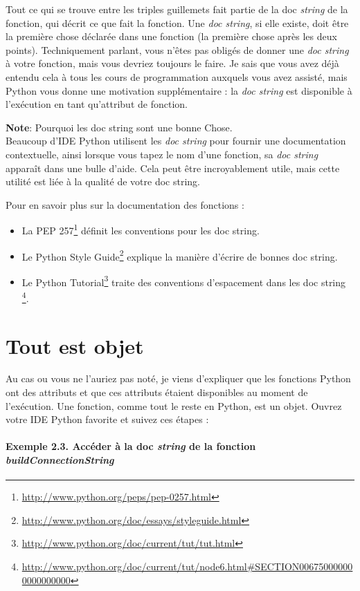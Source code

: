 Tout ce qui se trouve entre les triples guillemets fait partie de la doc \emph{string} de la fonction, qui décrit ce que fait la fonction. Une \emph{doc string}, si elle existe, doit être la première chose déclarée dans une fonction (la première chose après les deux points). Techniquement parlant, vous n'êtes pas obligés de donner une \emph{doc string} à votre fonction, mais vous devriez toujours le faire. Je sais que vous avez déjà entendu cela à tous les cours de programmation auxquels vous avez assisté, mais Python vous donne une motivation supplémentaire : la \emph{doc string} est disponible à l'exécution en tant qu'attribut de fonction.

\medskip
\noindent \textbf{Note}: Pourquoi les doc string sont une bonne Chose.\\
Beaucoup d'IDE Python utilisent les \emph{doc string} pour fournir une documentation contextuelle, ainsi lorsque vous tapez le nom d'une fonction, sa \emph{doc string} apparaît dans une bulle d'aide. Cela peut être incroyablement utile, mais cette utilité est liée à la qualité de votre doc string.

\medskip
\noindent Pour en savoir plus sur la documentation des fonctions :
\begin{itemize}
    \item{La PEP 257\footnote{\url{http://www.python.org/peps/pep-0257.html}} définit les conventions pour les doc string.}
    \item{Le Python Style Guide\footnote{\url{http://www.python.org/doc/essays/styleguide.html}} explique la manière d'écrire de bonnes doc string.}
    \item{Le Python Tutorial\footnote{\url{http://www.python.org/doc/current/tut/tut.html}} traite des conventions d'espacement dans les doc string \footnote{\url{http://www.python.org/doc/current/tut/node6.html\#SECTION006750000000000000000}}.}
\end{itemize}

\section{Tout est objet}
Au cas ou vous ne l'auriez pas noté, je viens d'expliquer que les fonctions Python ont des attributs et que ces attributs étaient disponibles au moment de l'exécution. 
Une fonction, comme tout le reste en Python, est un objet. Ouvrez votre IDE Python favorite et suivez ces étapes :

\paragraph*{Exemple 2.3. Accéder à la doc \emph{string} de la fonction \emph{buildConnectionString}}


